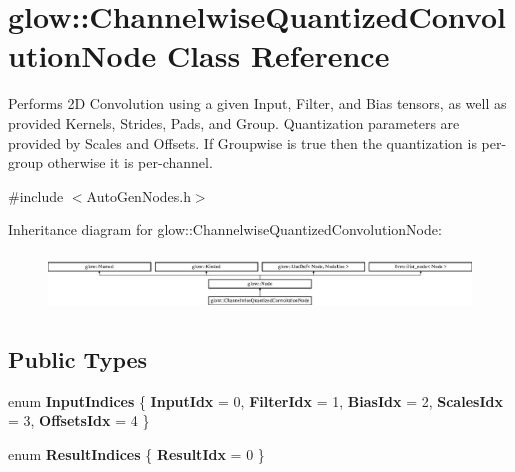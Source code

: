 \hypertarget{classglow_1_1_channelwise_quantized_convolution_node}{}\section{glow\+:\+:Channelwise\+Quantized\+Convolution\+Node Class Reference}
\label{classglow_1_1_channelwise_quantized_convolution_node}


Performs 2D Convolution using a given Input, Filter, and Bias tensors, as well as provided Kernels, Strides, Pads, and Group. Quantization parameters are provided by Scales and Offsets. If Groupwise is true then the quantization is per-\/group otherwise it is per-\/channel.  




{\ttfamily \#include $<$Auto\+Gen\+Nodes.\+h$>$}

Inheritance diagram for glow\+:\+:Channelwise\+Quantized\+Convolution\+Node\+:\begin{figure}[H]
\begin{center}
\leavevmode
\includegraphics[height=1.510791cm]{classglow_1_1_channelwise_quantized_convolution_node}
\end{center}
\end{figure}
\subsection*{Public Types}
\begin{DoxyCompactItemize}
\item 
\mbox{\label{classglow_1_1_channelwise_quantized_convolution_node_a89ac907d9a2fb1cb29bddf8762bee635}} 
enum {\bfseries Input\+Indices} \{ \newline
{\bfseries Input\+Idx} = 0, 
{\bfseries Filter\+Idx} = 1, 
{\bfseries Bias\+Idx} = 2, 
{\bfseries Scales\+Idx} = 3, 
\newline
{\bfseries Offsets\+Idx} = 4
 \}
\item 
\mbox{\label{classglow_1_1_channelwise_quantized_convolution_node_a9dcba562b83432b869c140dfea5f2f92}} 
enum {\bfseries Result\+Indices} \{ {\bfseries Result\+Idx} = 0
 \}
\end{DoxyCompactItemize}
